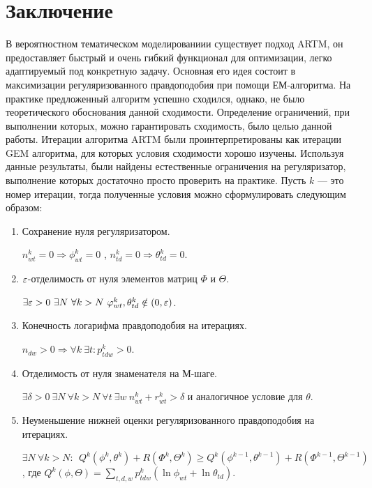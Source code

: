 \documentclass[12pt, twoside]{article}
\begin{document}
\section{Заключение}
	В вероятностном тематическом моделированиии существует подход ARTM, он предоставляет быстрый и очень гибкий функционал для оптимизации, легко адаптируемый под конкретную задачу. Основная его идея состоит в максимизации регуляризованного правдоподобия при помощи ЕМ-алгоритма. На практике предложенный алгоритм успешно сходился, однако, не было теоретического обоснования данной сходимости. Определение ограничений, при выполнении которых, можно гарантировать сходимость, было целью данной работы. Итерации алгоритма ARTM были проинтерпретированы как итерации GEM алгоритма, для которых условия сходимости хорошо изучены. Используя данные результаты, были найдены естественные ограничения на регуляризатор, выполнение которых достаточно просто проверить на практике. Пусть $k$ --- это номер итерации, тогда полученные условия можно сформулировать следующим образом:
\begin{enumerate}
\item Сохранение нуля регуляризатором.
\smallskip

$ n^k_{wt} = 0 \Rightarrow \phi^k_{wt} = 0$ , $n^k_{td} = 0 \Rightarrow \theta^k_{td} = 0$.
\item $\varepsilon$-отделимость от нуля элементов матриц $\Phi$ и $\Theta$.
\smallskip

$\exists \varepsilon>0\ \exists N\ \forall k > N\ \varphi^k_{wt}, \theta^k_{td} \notin (0, \varepsilon)$. 
\item  Конечность логарифма правдоподобия на итерациях.
\smallskip

$ n_{dw}>0 \Rightarrow \forall k\ \exists t\colon p^k_{tdw} > 0$.
\item Отделимость от нуля знаменателя на М-шаге.
\smallskip

$\exists \delta >0\ \exists N\ \forall k > N \ \forall t\ \exists w\  n^k_{wt} + r^k_{wt} > \delta$ и аналогичное условие для $\theta$. 
\item Неуменьшение нижней оценки регуляризованного правдоподобия на итерациях.
\smallskip

$\exists N\ \forall k > N\colon\ \ Q^k (\phi^k, \theta^k)+ R(\Phi^k, \Theta^k) \geq Q^k(\phi^{k-1}, \theta^{k-1}) + R(\Phi^{k-1}, \Theta^{k-1})$, где $Q^k(\phi, \Theta) = \sum\limits_{t,d,w} p^k_{tdw} (\ln \phi_{wt} + \ln \theta_{td})$.
\end{enumerate}
\end{document}
